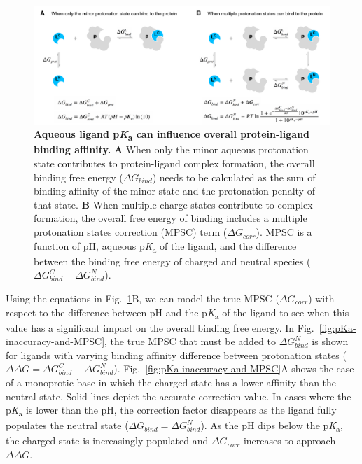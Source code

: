 \documentclass[9pt,lineno,final]{elife}
\newcommand{\pKa}{p\textit{K}\textsubscript{a}}
\begin{document}


\begin{figure}[h]
\centering
\includegraphics[width=1.0\linewidth]{figures/pKa-effects-on-protein-ligand-binding.pdf}
\caption{ {\bf Aqueous ligand \pKa{} can influence overall protein-ligand binding affinity.} 
{\bf A} When only the minor aqueous protonation state contributes to protein-ligand complex formation, the overall binding free energy ($\Delta G_{bind}$) needs to be calculated as the sum of binding affinity of the minor state and the protonation penalty of that state. 
{\bf B} When multiple charge states contribute to complex formation, the overall free energy of binding includes a multiple protonation states correction (MPSC) term ($\Delta G_{corr}$). 
MPSC is a function of pH, aqueous \pKa{} of the ligand, and the difference between the binding free energy of charged and neutral species ($\Delta G_{bind}^{C} - \Delta G_{bind}^{N}$).
}
\label{fig:pKa-effects-on-protein-ligand-binding}
\end{figure}

Using the equations in Fig.~\ref{fig:pKa-effects-on-protein-ligand-binding}B, we can model the true MPSC ($\Delta G_{corr}$) with respect to the difference between pH and the \pKa{} of the ligand to see when this value has a significant impact on the overall binding free energy. 
In Fig.~\ref{fig:pKa-inaccuracy-and-MPSC}, the true MPSC that must be added to $\Delta G_{bind}^{N}$ is shown for ligands with varying binding affinity difference between protonation states ($\Delta\Delta G = \Delta G_{bind}^{C} - \Delta G_{bind}^{N}$). Fig.~\ref{fig:pKa-inaccuracy-and-MPSC}A shows the case of a monoprotic base in which the charged state has a lower affinity than the neutral state. 
Solid lines depict the accurate correction value. 
In cases where the \pKa{} is lower than the pH, the correction factor disappears as the ligand fully populates the neutral state ($\Delta G_{bind} = \Delta G_{bind}^{N}$). 
As the pH dips below the \pKa{}, the charged state is increasingly populated and $\Delta G_{corr}$ increases to approach $\Delta\Delta G$. 
\end{document}
